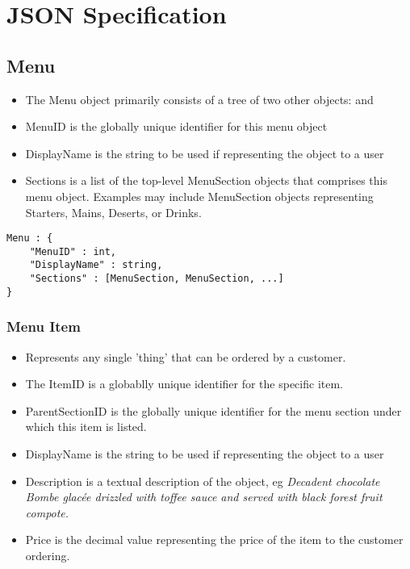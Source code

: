 \documentclass[12pt, a4paper]{article}
\begin{document}
\section{JSON Specification}

\subsection{Menu}\label{subsec:Menu}

\begin{itemize}
\item The Menu object primarily consists of a tree of two other objects:  and 

\item MenuID is the globally unique identifier for this menu object

\item DisplayName is the string to be used if representing the object to a user

\item Sections is a list of the top-level MenuSection objects that comprises this menu object. Examples may include MenuSection objects representing Starters, Mains, Deserts, or Drinks.
\end{itemize}

\begin{verbatim}
Menu : {
	"MenuID" : int,
	"DisplayName" : string,
	"Sections" : [MenuSection, MenuSection, ...]
}
\end{verbatim}


\subsubsection{Menu Item} \label{subsubsec:MenuItem}

\begin{itemize}
\item Represents any single 'thing' that can be ordered by a customer.
\item The ItemID is a globablly unique identifier for the specific item.
\item ParentSectionID is the globally unique identifier for the menu section under which this item is listed.
\item DisplayName is the string to be used if representing the object to a user
\item Description is a textual description of the object, eg \textit{Decadent chocolate Bombe glacée drizzled with toffee sauce and served with black forest fruit compote.}
\item Price is the decimal value representing the price of the item to the customer ordering.
\end{itemize}
\end{document}
